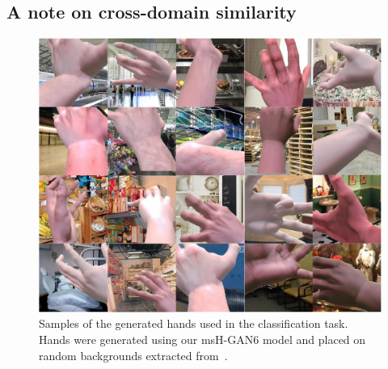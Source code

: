 \subsection{A note on cross-domain similarity}
\begin{figure}[!t]
	\centering
	\includegraphics[width=\textwidth]{figures/synthtoreal/hands_application.jpg}
	\caption{Samples of the generated hands used in the classification task. Hands were generated using our \mbox{msH-GAN6} model and placed on random backgrounds extracted from~\cite{Quattoni2009}.}
	\label{fig:hand_application}
\end{figure}
